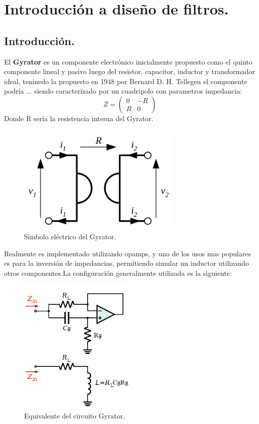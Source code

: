 \documentclass[a4paper]{article}
\begin{document}
\section{Introducción a diseño de filtros.}
\subsection{Introducción.}
El \textbf{Gyrator} es un componente electrónico inicialmente propuesto como el quinto componente lineal y pasivo luego del resistor, capacitor, inductor y transformador ideal, teninedo la propuesto en 1948 por Bernard D. H. Tellegen el componente podría ... siendo caracterizado por un cuadripolo con parametros impedancia:
$$ Z= \left(\begin{matrix}0&-R\\R&0\end{matrix}\right) $$
Donde R sería la resistencia interna del Gyrator.

\begin{figure}[H]	
	\centering
	\includegraphics[width=0.7\textwidth]{gyratorsimb.png}
	\caption{Simbolo eléctrico del Gyrator.}
	\label{fig:gyrsimb}
\end{figure}
Realmente es implementado utilizando opamps, y uno de los usos mas populares es para la inversión de impedancias, permitiendo simular un inductor utilizando otros componentes.La configuración generalmente utilizada es la siguiente:
\begin{figure}[H]	
	\centering
	\includegraphics[width=0.5\textwidth]{gyrop.png}
	\caption{Equivalente del circuito Gyrator.}
	\label{fig:gyrop}
\end{figure}
\end{document}
